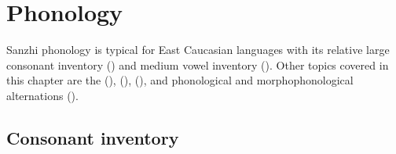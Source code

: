\chapter{Phonology}\label{cpt:phonology}

Sanzhi phonology is typical for East Caucasian languages with its relative large consonant inventory () and medium vowel inventory (). Other topics covered in this chapter are the  (),  (),  (), and phonological and morphophonological alternations (). 



\section{Consonant inventory}
\label{sec:Consonant inventory}

